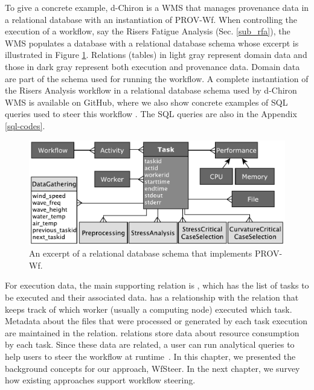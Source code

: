 To give a concrete example, d-Chiron \cite{Souza2015Parallel} is a WMS that manages provenance data in a relational database with an instantiation of PROV-Wf.
When controlling the execution of a workflow,
say the Risers Fatigue Analysis (Sec. \ref{sub_rfa}),
the WMS populates a database with a relational database schema whose excerpt is illustrated in Figure \ref{fig:prov_rfa_dataschema}.
Relations (tables) in
light gray represent domain data and those in dark gray represent both
execution and provenance data. Domain data are part of the schema used for running the workflow.
A complete instantiation of the Risers Analysis workflow in a relational database
schema used by d-Chiron WMS is available on GitHub, where we also show concrete examples of SQL queries used to steer this workflow
\cite{d-ChironGitHub}. The SQL queries are also in the Appendix \ref{sql-codes}.

\begin{figure}
    \centering
    \includegraphics[width=\textwidth,keepaspectratio]{img/dchiron-data-model.pdf}
    \caption{An excerpt of a relational database schema that implements PROV-Wf.}
    \label{fig:prov_rfa_dataschema}
\end{figure}


For execution data, the main supporting relation is ,
which has the list of tasks to be executed and their associated data.
 has a
relationship with the  relation that keeps track of which worker
(usually a computing node) executed which task.
Metadata about the files
that were processed or generated by each task execution are maintained
in the  relation.  relations store data about resource
consumption by each task.
Since  these data are related, a user can run analytical queries to
help users to steer the workflow
at runtime~\cite{Souza2017Data,Dias2015Data-centric,DeOliveira2015How,silva_adding_2018,Souza2015Monitoramento}. 
In this chapter, we presented the background concepts for our approach, WfSteer. In the next chapter, we survey how existing approaches support  workflow steering.
